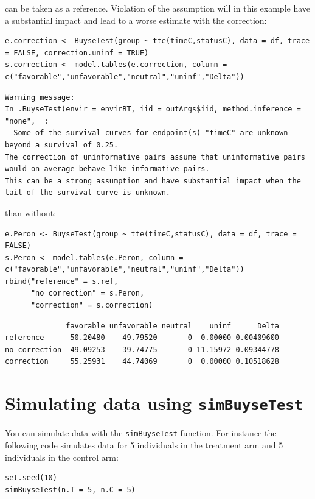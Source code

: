 \documentclass[12pt]{article}
\begin{document}
can be taken as a reference. Violation of the assumption will in this
example have a substantial impact and lead to a worse estimate with
the correction:
\lstset{language=r,label= ,caption= ,captionpos=b,numbers=none}
\begin{lstlisting}
e.correction <- BuyseTest(group ~ tte(timeC,statusC), data = df, trace = FALSE, correction.uninf = TRUE)
s.correction <- model.tables(e.correction, column = c("favorable","unfavorable","neutral","uninf","Delta"))
\end{lstlisting}

\begin{verbatim}
Warning message:
In .BuyseTest(envir = envirBT, iid = outArgs$iid, method.inference = "none",  :
  Some of the survival curves for endpoint(s) "timeC" are unknown beyond a survival of 0.25.
The correction of uninformative pairs assume that uninformative pairs would on average behave like informative pairs. 
This can be a strong assumption and have substantial impact when the tail of the survival curve is unknown.
\end{verbatim}


than without:
\lstset{language=r,label= ,caption= ,captionpos=b,numbers=none}
\begin{lstlisting}
e.Peron <- BuyseTest(group ~ tte(timeC,statusC), data = df, trace = FALSE)
s.Peron <- model.tables(e.Peron, column = c("favorable","unfavorable","neutral","uninf","Delta"))
rbind("reference" = s.ref,
      "no correction" = s.Peron,
      "correction" = s.correction)
\end{lstlisting}
\begin{verbatim}
              favorable unfavorable neutral    uninf      Delta
reference      50.20480    49.79520       0  0.00000 0.00409600
no correction  49.09253    39.74775       0 11.15972 0.09344778
correction     55.25931    44.74069       0  0.00000 0.10518628
\end{verbatim}


\clearpage

\section{Simulating data using \texttt{simBuyseTest}}
\label{sec:org0c3cf57}
You can simulate data with the \texttt{simBuyseTest} function. For instance
the following code simulates data for 5 individuals in the treatment
arm and 5 individuals in the control arm:
\lstset{language=r,label= ,caption= ,captionpos=b,numbers=none}
\begin{lstlisting}
set.seed(10)
simBuyseTest(n.T = 5, n.C = 5)
\end{lstlisting}
\end{document}
